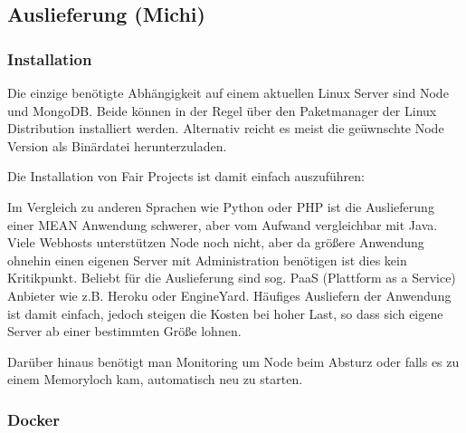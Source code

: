 \subsection{Auslieferung (Michi)}\label{auslieferung-michi}

\subsubsection{Installation}\label{installation}

Die einzige benötigte Abhängigkeit auf einem aktuellen Linux Server sind
Node und MongoDB. Beide können in der Regel über den Paketmanager der
Linux Distribution installiert werden. Alternativ reicht es meist die
geüwnschte Node Version als Binärdatei herunterzuladen.

Die Installation von Fair Projects ist damit einfach auszuführen:

\begin{Shaded}
\begin{Highlighting}[]
 
 

 

 

 
\end{Highlighting}
\end{Shaded}

Im Vergleich zu anderen Sprachen wie Python oder PHP ist die
Auslieferung einer MEAN Anwendung schwerer, aber vom Aufwand
vergleichbar mit Java. Viele Webhosts unterstützen Node noch nicht, aber
da größere Anwendung ohnehin einen eigenen Server mit Administration
benötigen ist dies kein Kritikpunkt. Beliebt für die Auslieferung sind
sog. PaaS (Plattform as a Service) Anbieter wie z.B. Heroku oder
EngineYard. Häufiges Ausliefern der Anwendung ist damit einfach, jedoch
steigen die Kosten bei hoher Last, so dass sich eigene Server ab einer
bestimmten Größe lohnen.

Darüber hinaus benötigt man Monitoring um Node beim Absturz oder falls
es zu einem Memoryloch kam, automatisch neu zu starten.

\subsubsection{Docker}\label{docker}

